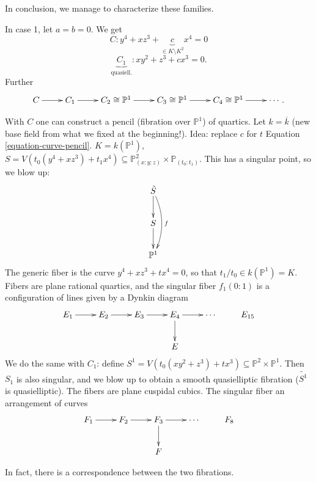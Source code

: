 \noindent
In conclusion, we manage to characterize these families.

\begin{example}
\label{example-chain-of-maps}
In case 1, let $a=b=0$. We get
\begin{equation}
\label{equation-curve-pencil}
C: y^4+xz^3+\underbrace{c}_{\in K\setminus K^2}x^4=0
\end{equation}
$$
\underbrace{C_1}_{\text{quasiell.}}:xy^2+z^3+cx^3=0.
$$
Further
$$
\xymatrix{
C\ar[r]&C_1\ar[r]&C_2 \cong\mathbb{P}^1\ar[r]
&C_3 \cong \mathbb{P}^1\ar[r]&C_4\cong \mathbb{P}^1\ar[r]&\cdots.
}
$$
\end{example}

\medskip\noindent
With $C$ one can construct a pencil (fibration over $\mathbb{P}^1$)
of quartics.
Let $k=\overline{k}$ (new base field from what we fixed at the beginning!).
Idea: replace $c$ for $t$ Equation \ref{equation-curve-pencil}.
 $K=k(\mathbb{P}^1)$, $S=V(t_0(y^4+xz^3)+t_1x^4)
\subseteq \mathbb{P}^2_{(x:y:z)}\times \mathbb{P}_{(t_0:t_1)}$.
This has a singular point, so we blow up:
$$
\xymatrix{
\tilde{S}\ar[d]\ar@/^1em/[dd]^f\\ S\ar[d]\\\mathbb{P}^1
}
$$
The generic fiber is the curve $y^4+xz^3+tx^4=0$,
so that $t_1/t_0 \in k(\mathbb{P}^1)=K$.
Fibers are plane rational quartics,
and the singular fiber $f_1(0:1)$ is a configuration of lines
given by a Dynkin diagram
$$
\xymatrix{
E_1 \ar[r]& E_2\ar[r]& E_3 \ar[r]& E_4\ar[d]\ar[r]& \cdots & E_{15}\\
& & & E
}
$$
We do the same with $C_1$: define 
$S^1=V(t_0(xy^2+z^3)+tx^3) \subseteq \mathbb{P}^2 \times \mathbb{P}^1$.
Then $S_1$ is also singular, and we blow up to obtain a smooth
quasielliptic fibration ($\tilde{S^1}$ is quasielliptic).
The fibers are plane cuspidal cubics.
The singular fiber an arrangement of curves
$$
\xymatrix{
F_1 \ar[r]& F_2\ar[r]& F_3\ar[d]\ar[r]& \cdots & F_8\\
& & F
}
$$

In fact, there is a correspondence between the two fibrations.


 





